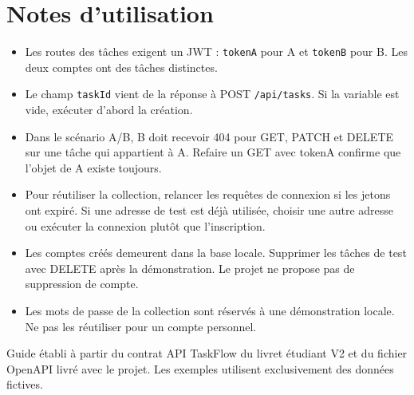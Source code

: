 \documentclass[10pt,a4paper]{article}
\begin{document}
\section*{Notes d'utilisation}
\begin{itemize}
\item Les routes des tâches exigent un JWT : \texttt{tokenA} pour A et \texttt{tokenB} pour B. Les deux comptes ont des tâches distinctes.
\item Le champ \texttt{taskId} vient de la réponse à POST \texttt{/api/tasks}. Si la variable est vide, exécuter d'abord la création.
\item Dans le scénario A/B, B doit recevoir 404 pour GET, PATCH et DELETE sur une tâche qui appartient à A. Refaire un GET avec tokenA confirme que l'objet de A existe toujours.
\item Pour réutiliser la collection, relancer les requêtes de connexion si les jetons ont expiré. Si une adresse de test est déjà utilisée, choisir une autre adresse ou exécuter la connexion plutôt que l'inscription.
\item Les comptes créés demeurent dans la base locale. Supprimer les tâches de test avec DELETE après la démonstration. Le projet ne propose pas de suppression de compte.
\item Les mots de passe de la collection sont réservés à une démonstration locale. Ne pas les réutiliser pour un compte personnel.
\end{itemize}

\vfill
\textcolor{muted}{Guide établi à partir du contrat API TaskFlow du livret étudiant V2 et du fichier OpenAPI livré avec le projet. Les exemples utilisent exclusivement des données fictives.}
\end{document}
